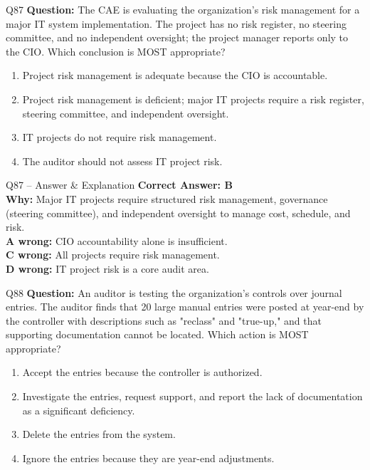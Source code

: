\documentclass[aspectratio=169,10pt]{beamer}
\begin{document}
	\begin{frame}[t]{Q87}
		\small
		\textbf{Question:} The CAE is evaluating the organization's risk management for a major IT system implementation. The project has no risk register, no steering committee, and no independent oversight; the project manager reports only to the CIO. Which conclusion is MOST appropriate?
		\begin{enumerate}[label=\Alph*.,itemsep=1pt,topsep=2pt]
			\item Project risk management is adequate because the CIO is accountable.
			\item Project risk management is deficient; major IT projects require a risk register, steering committee, and independent oversight.
			\item IT projects do not require risk management.
			\item The auditor should not assess IT project risk.
		\end{enumerate}
	\end{frame}
	
	\begin{frame}[t]{Q87 -- Answer \& Explanation}
		\small
		\textbf{Correct Answer: B} \\[4pt]
		\textbf{Why:} Major IT projects require structured risk management, governance (steering committee), and independent oversight to manage cost, schedule, and risk. \\[4pt]
		\textbf{A wrong:} CIO accountability alone is insufficient. \\[2pt]
		\textbf{C wrong:} All projects require risk management. \\[2pt]
		\textbf{D wrong:} IT project risk is a core audit area.
	\end{frame}
	
	\begin{frame}[t]{Q88}
		\small
		\textbf{Question:} An auditor is testing the organization's controls over journal entries. The auditor finds that 20 large manual entries were posted at year-end by the controller with descriptions such as "reclass" and "true-up," and that supporting documentation cannot be located. Which action is MOST appropriate?
		\begin{enumerate}[label=\Alph*.,itemsep=1pt,topsep=2pt]
			\item Accept the entries because the controller is authorized.
			\item Investigate the entries, request support, and report the lack of documentation as a significant deficiency.
			\item Delete the entries from the system.
			\item Ignore the entries because they are year-end adjustments.
		\end{enumerate}
	\end{frame}
	
\end{document}

